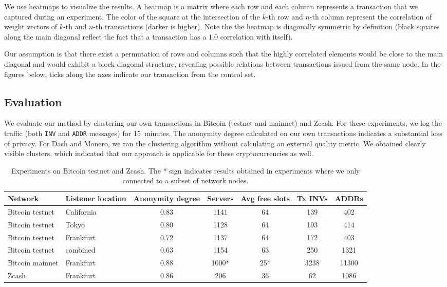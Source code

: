 We use heatmaps to visualize the results.
A heatmap is a matrix where each row and each column represents a transaction that we captured during an experiment.
The color of the square at the intersection of the $k$-th row and $n$-th column represent the correlation of weight vectors of $k$-th and $n$-th transactions (darker is higher).
Note the the heatmap is diagonally symmetric by definition (black squares along the  main diagonal reflect the fact that a transaction has a $1.0$ correlation with itself).

Our assumption is that there exist a permutation of rows and columns such that the highly correlated elements would be close to the main diagonal and would exhibit a block-diagonal structure, revealing possible relations between transactions issued from the same node.
In the figures below, ticks along the axes indicate our transaction from the control set.


\subsection{Evaluation}

We evaluate our method by clustering our own transactions in Bitcoin (testnet and mainnet) and Zcash.
For these experiments, we log the traffic (both \texttt{INV} and \texttt{ADDR} messages) for 15~minutes.
The anonymity degree calculated on our own transactions indicates a substantial loss of privacy.
For Dash and Monero, we ran the clustering algorithm without calculating an external quality metric.
We obtained clearly visible clusters, which indicated that our approach is applicable for these cryptocurrencies as well.

\begin{table*}[!t]
	\normalsize
	\caption{Experiments on Bitcoin testnet and Zcash. The * sign indicates results obtained in experiments where we only connected to a subset of network nodes.}
	\centering
	\begin{tabular}{ | l | l | c | c | c | c | c | }
		\hline
		Network & Listener location & Anonymity degree & Servers & Avg free slots & Tx INVs & ADDRs \\
		\hline
		Bitcoin testnet  & California & 0.83 & 1141 & 64 & 139 & 402 \\
		Bitcoin testnet & Tokyo & 0.80 & 1128 & 64 & 193 & 414 \\
		Bitcoin testnet & Frankfurt & 0.72 & 1137 & 64 & 172 & 403 \\
		Bitcoin testnet & combined & 0.63 & 1154 & 63 & 250 & 1321 \\
		Bitcoin mainnet & Frankfurt & 0.88 & 1000* & 25* & 3238 & 11300 \\
		Zcash & Frankfurt & 0.86 & 206 & 36 & 62 & 1086 \\
		\hline
	\end{tabular}
	\label{tab:results}
\end{table*}

